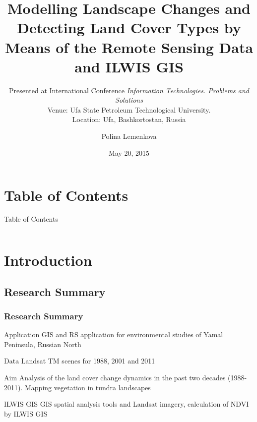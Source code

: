 \documentclass[pdflatex,compress,8pt,
	xcolor={dvipsnames,dvipsnames,svgnames,x11names,table},
	hyperref={colorlinks = true,
	breaklinks = true, 
	urlcolor = NavyBlue, 
	breaklinks = true}]{beamer}
\author{Polina Lemenkova}
\title[Modelling Landscape Changes and Detecting Land Cover Types by Means of the RS Data and ILWIS GIS]{\Large{Modelling Landscape Changes and Detecting Land Cover Types by Means of the Remote Sensing Data and ILWIS GIS}}
\subtitle{\small{Presented at \nth{3} International Conference \emph{Information Technologies. Problems and Solutions}\\
Venue: Ufa State Petroleum Technological University. \\
Location: Ufa, Bashkortostan, Russia}}
\institute{Arctic Center, University of Lapland}
\date{May 20, 2015}
\begin{document}
\frame[plain]{\titlepage}

\section*{Table of Contents}
\begin{frame}{Table of Contents}
    \begin{columns}[onlytextwidth,T]
        \begin{column}{.45\textwidth}
            \small{\tableofcontents[sections=1-4]}
        \end{column}
        \begin{column}{.45\textwidth}
            \small{\tableofcontents[sections=5-15]}
        \end{column}
    \end{columns}
\end{frame}

\section{Introduction}
\subsection{Research Summary}
\begin{frame}\frametitle{Research Summary}

\begin{alertblock}{Application}
GIS and RS application for environmental studies of Yamal Peninsula, Russian North
\end{alertblock}

\begin{block}{Data}
Landsat TM scenes for 1988, 2001 and 2011
\end{block}

\begin{alertblock}{Aim}
Analysis of the land cover change dynamics in the past two decades (1988-2011). Mapping vegetation in tundra landscapes
\end{alertblock}

\begin{block}{ILWIS GIS}
GIS spatial analysis tools and Landsat imagery, calculation of NDVI by ILWIS GIS
\end{block}

\end{frame}
\end{document}
